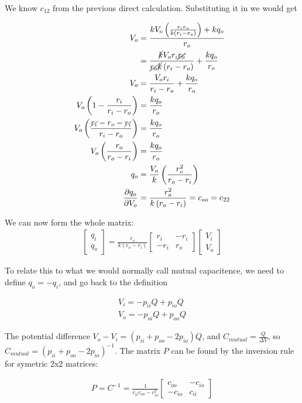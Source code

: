 \documentclass[paper=a4, fontsize=11pt]{scrartcl} %
\numberwithin{equation}{section} %
\numberwithin{figure}{section} %
\numberwithin{table}{section} %
\begin{document}
We know $c_{12}$ from the previous direct calculation. Substituting it in we would get 

\begin{align}
V_o &= \frac{k V_o \left(\frac{r_i r_o}{k\left(r_i - r_o\right)}\right) + kq_o}{r_o}\\
&= \frac{\cancel{k} V_o r_i \cancel{r_o}}{\cancel{r_o} \cancel{k} \left(r_i - r_o\right)} + \frac{kq_o}{r_o} \\
V_o &= \frac{V_o r_i}{r_i - r_o} + \frac{k q_o}{r_o} \\
V_o\left(1 - \frac{r_i}{r_i - r_o}\right) &= \frac{k q_o}{r_o} \\
V_o \left(\frac{\cancel{r_i} - r_o - \cancel{r_i}}{r_i - r_o}\right) &= \frac{k q_o}{r_o} \\
V_o\left(\frac{r_o}{r_o - r_i}\right) &= \frac{k q_o}{r_o} \\
q_o &= \frac{V_o}{k}\left(\frac{r_o^2}{r_o - r_i}\right) \\
\frac{\partial q_o}{\partial V_o} &= \frac{r_o^2}{k\left(r_o - r_i\right)} = c_{oo} = c_{22}
\end{align}

We can now form the whole matrix:
\begin{align}
\begin{bmatrix}
q_i \\
q_o
\end{bmatrix}
= \frac{r_o}{k\left(r_o - r_i\right)}
\begin{bmatrix}
r_i & - r_i \\
- r_i & r_o
\end{bmatrix}
\begin{bmatrix}
V_i \\
V_o
\end{bmatrix}
\end{align}

To relate this to what we would normally call mutual capacitence, we need to define $q_o = - q_i$, and go back to the definition 

\begin{align}
V_i = -p_{ii}Q + p_{io}Q \\
V_o = -p_{oi}Q + p_{oo}Q
\end{align}

The potential difference $V_o - V_i = (p_{ii} + p_{oo} - 2p_{io})Q$, and $C_{mutual} = \frac{Q}{\Delta V}$, so $C_{mutual} = (p_{ii} + p_{oo} - 2 p_{io})^{-1}$. The matrix $P$ can be found by the inversion rule for symetric 2x2 matrices:

\begin{align}
P = C^{-1} = \frac{1}{c_{ii}c_{oo} -  c_{io}^2}
\begin{bmatrix}
c_{oo} & - c_{io} \\
- c_{io} & c_{ii} 
\end{bmatrix}
\end{align}
\end{document}
